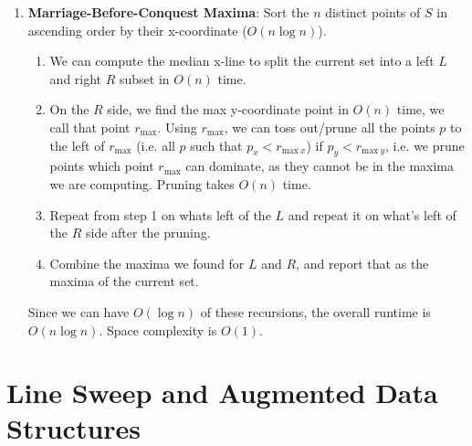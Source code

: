 \documentclass [12pt]{article}
\begin{document}
\begin{enumerate}[label=\alph*.]
            \item \textbf{Marriage-Before-Conquest Maxima}\footnotemark[1]: Sort the $n$ distinct points of $S$ in ascending order by their x-coordinate ($O(n\log n)$). 
            
                \begin{enumerate}[label=\arabic*)]
                    \item We can compute the median x-line to split the current set into a left $L$ and right $R$ subset in $O(n)$ time. 
                    
                    \item On the $R$ side, we find the max y-coordinate point in $O(n)$ time, we call that point $r_\text{max}$. Using $r_\text{max}$, we can toss out/prune all the points $p$ to the left of $r_\text{max}$ (i.e. all $p$ such that $p_x < r_{\text{max}\ x}$) if $p_y < r_{\text{max}\ y}$, i.e. we prune points which point $r_\text{max}$ can dominate, as they cannot be in the maxima we are computing. Pruning takes $O(n)$ time.
                    
                    \item Repeat from step 1 on whats left of the $L$ and repeat it on what's left of the $R$ side after the pruning. 
                    
                    \item Combine the maxima we found for $L$ and $R$, and report that as the maxima of the current set.
                \end{enumerate}

            Since we can have $O(\log n)$ of these recursions, the overall runtime is $O(n\log n)$. Space complexity is $O(1)$.
        \end{enumerate}
        

    
    \section{Line Sweep and Augmented Data Structures}
    \label{sec:two}

        
    \pagebreak



\end{document}
